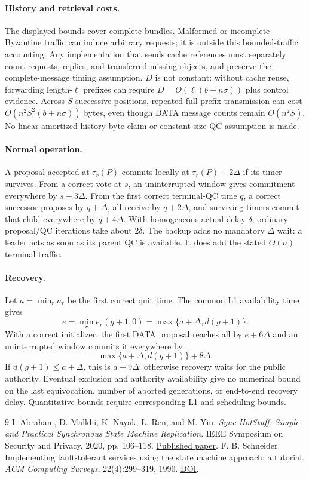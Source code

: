 \documentclass[11pt,a4paper]{article}
\begin{document}
\paragraph{History and retrieval costs.}
The displayed bounds cover complete bundles. Malformed or incomplete
Byzantine traffic can induce arbitrary requests; it is outside this
bounded-traffic accounting. Any implementation that sends cache references
must separately count requests, replies, and transferred missing objects,
and preserve the complete-message timing assumption. $D$ is not constant:
without cache reuse, forwarding length-$\ell$ prefixes can require
$D=O(\ell(b+n\sigma))$ plus control evidence. Across $S$ successive
positions, repeated full-prefix transmission can cost
$O(n^2S^2(b+n\sigma))$ bytes, even though DATA message counts remain
$O(n^2S)$. No linear amortized history-byte claim or constant-size QC
assumption is made.

\paragraph{Normal operation.}
A proposal accepted at $\tau_r(P)$ commits locally at
$\tau_r(P)+2\Delta$ if its timer survives. From a correct vote at $s$,
an uninterrupted window gives commitment everywhere by $s+3\Delta$.
From the first correct terminal-QC time $q$, a correct successor proposes
by $q+\Delta$, all receive by $q+2\Delta$, and surviving timers commit
that child everywhere by $q+4\Delta$. With homogeneous actual delay
$\delta$, ordinary proposal/QC iterations take about $2\delta$.
The backup adds no mandatory $\Delta$ wait: a leader acts as soon as
its parent QC is available. It does add the stated $O(n)$ terminal traffic.

\paragraph{Recovery.}
Let $a=\min_r a_r$ be the first correct quit time. The common L1
availability time gives
\[
 e=\min_r e_r(g+1,0)=\max\{a+\Delta,d(g+1)\}.
\]
With a correct initializer, the first DATA proposal reaches all by
$e+6\Delta$ and an uninterrupted window commits it everywhere by
\[
 \max\{a+\Delta,d(g+1)\}+8\Delta.
\]
If $d(g+1)\le a+\Delta$, this is $a+9\Delta$; otherwise recovery
waits for the public authority. Eventual exclusion and
authority availability give no numerical bound on the last equivocation,
number of aborted generations, or end-to-end recovery delay. Quantitative
bounds require corresponding L1 and scheduling bounds.

\begin{thebibliography}{9}
I. Abraham, D. Malkhi, K. Nayak, L. Ren, and M. Yin.
\emph{Sync HotStuff: Simple and Practical Synchronous State Machine Replication}.
IEEE Symposium on Security and Privacy, 2020, pp. 106--118.
\href{https://conferences.computer.org/sp/pdfs/sp/2020/349700a106.pdf}{Published paper}.
F. B. Schneider. Implementing fault-tolerant services using the state machine
approach: a tutorial. \emph{ACM Computing Surveys}, 22(4):299--319, 1990.
\href{https://doi.org/10.1145/98163.98167}{DOI}.
\end{thebibliography}
\end{document}
